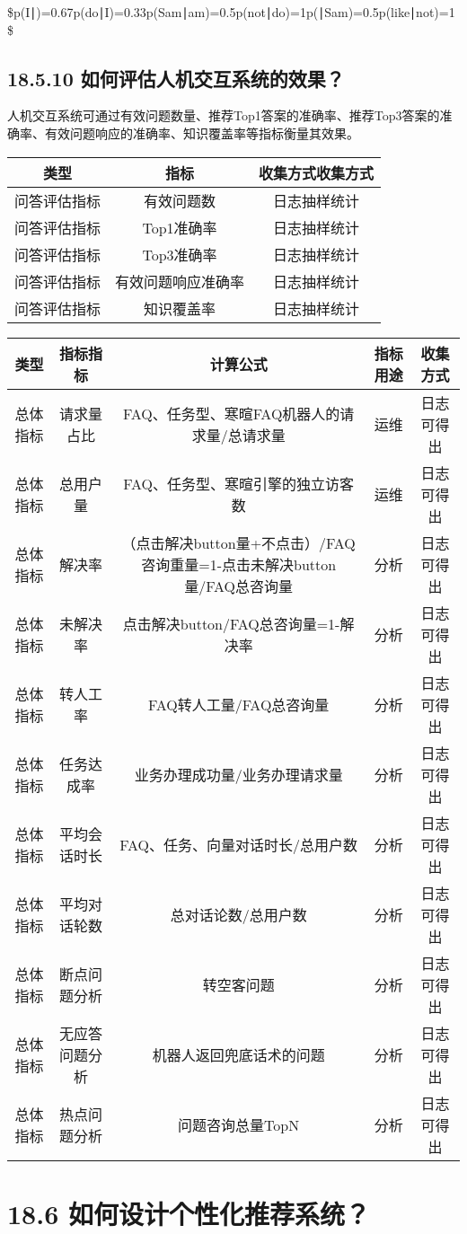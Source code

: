 \$p(I∣)=0.67p(do∣I)=0.33p(Sam∣am)=0.5p(not∣do)=1p(∣Sam)=0.5p(like∣not)=1
\$

\subsection{18.5.10
如何评估人机交互系统的效果？}\label{ux5982ux4f55ux8bc4ux4f30ux4ebaux673aux4ea4ux4e92ux7cfbux7edfux7684ux6548ux679c}

​
人机交互系统可通过有效问题数量、推荐Top1答案的准确率、推荐Top3答案的准确率、有效问题响应的准确率、知识覆盖率等指标衡量其效果。

\begin{longtable}[]{ ccc }
\toprule
类型 & 指标 & 收集方式收集方式\tabularnewline
\midrule
\endhead
问答评估指标 & 有效问题数 & 日志抽样统计\tabularnewline
问答评估指标 & Top1准确率 & 日志抽样统计\tabularnewline
问答评估指标 & Top3准确率 & 日志抽样统计\tabularnewline
问答评估指标 & 有效问题响应准确率 & 日志抽样统计\tabularnewline
问答评估指标 & 知识覆盖率 & 日志抽样统计\tabularnewline
\bottomrule
\end{longtable}

\begin{longtable}[]{ ccccc }
\toprule
类型 & 指标指标 & 计算公式 & 指标用途 & 收集方式\tabularnewline
\midrule
\endhead
总体指标 & 请求量占比 & FAQ、任务型、寒暄FAQ机器人的请求量/总请求量 &
运维 & 日志可得出\tabularnewline
总体指标 & 总用户量 & FAQ、任务型、寒暄引擎的独立访客数 & 运维 &
日志可得出\tabularnewline
总体指标 & 解决率 &
（点击解决button量+不点击）/FAQ咨询重量=1-点击未解决button量/FAQ总咨询量
& 分析 & 日志可得出\tabularnewline
总体指标 & 未解决率 & 点击解决button/FAQ总咨询量=1-解决率 & 分析 &
日志可得出\tabularnewline
总体指标 & 转人工率 & FAQ转人工量/FAQ总咨询量 & 分析 &
日志可得出\tabularnewline
总体指标 & 任务达成率 & 业务办理成功量/业务办理请求量 & 分析 &
日志可得出\tabularnewline
总体指标 & 平均会话时长 & FAQ、任务、向量对话时长/总用户数 & 分析 &
日志可得出\tabularnewline
总体指标 & 平均对话轮数 & 总对话论数/总用户数 & 分析 &
日志可得出\tabularnewline
总体指标 & 断点问题分析 & 转空客问题 & 分析 & 日志可得出\tabularnewline
总体指标 & 无应答问题分析 & 机器人返回兜底话术的问题 & 分析 &
日志可得出\tabularnewline
总体指标 & 热点问题分析 & 问题咨询总量TopN & 分析 &
日志可得出\tabularnewline
\bottomrule
\end{longtable}

\section{18.6
如何设计个性化推荐系统？}\label{ux5982ux4f55ux8bbeux8ba1ux4e2aux6027ux5316ux63a8ux8350ux7cfbux7edf}

